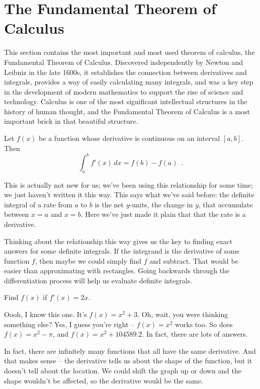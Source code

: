 \section{The Fundamental Theorem of Calculus}
\label{sec:fund-theorem}
This section contains the most important and most used theorem of calculus, the Fundamental Theorem of Calculus. Discovered independently by Newton and Leibniz in the late 1600s, it establishes the connection between derivatives and integrals, provides a way of easily calculating many integrals, and was a key step in the development of modern mathematics to support the rise of science and technology. Calculus is one of the most significant intellectual structures in the history of human thought, and the Fundamental Theorem of Calculus is a most important brick in that beautiful structure.

\begin{theorem}
Let $f(x)$ be a function whose derivative is continuous on an interval $[a, b]$. Then
$$\int_a^b f'(x)\,dx = f(b)-f(a) \enspace .$$
\end{theorem}
This is actually not new for us; we've been using this relationship for some time; we just haven't written it this way. This says what we've said before: the definite integral of a rate from $a$ to $b$ is the net $y$-units, the change in $y$, that accumulate between $x=a$ and $x=b$. Here we've just made it plain that that the rate is a derivative.

Thinking about the relationship this way gives us the key to finding exact answers for some definite integrals. If the integrand is the derivative of some function $f$, then maybe we could simply find $f$ and subtract. That would be easier than approximating with rectangles. Going backwards through the differentiation process will help us evaluate definite integrals.

\begin{example}
Find $f(x)$ if $f'(x)=2x$.

\begin{solution}
Oooh, I know this one. It's $f(x)=x^2+3$. Oh, wait, you were thinking something else? Yes, I guess you're right -- $f(x)=x^2$ works too. So does $f(x)=x^2-\pi$, and $f(x)=x^2+104589.2$. In fact, there are lots of answers.
\end{solution}\end{example}

In fact, there are infinitely many functions that all have the same derivative. And that makes sense – the derivative tells us about the shape of the function, but it doesn't tell about the location. We could shift the graph up or down and the shape wouldn't be affected, so the derivative would be the same.

